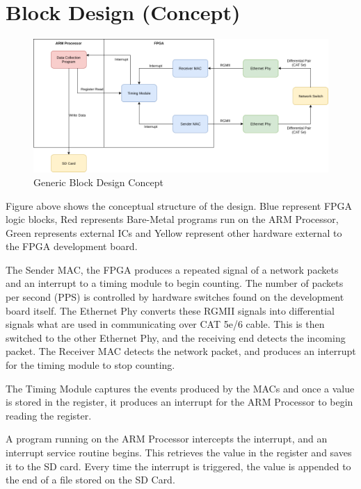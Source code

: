 \section{Block Design (Concept)}

\begin{figure}[H]
    \begin{center}
        \includegraphics[keepaspectratio,width=15cm]{Images/BlockDesignConcept}
        \caption{Generic Block Design Concept}
        \label{fig:blockdesignconcept}
    \end{center}
\end{figure}

\par Figure above shows the conceptual structure of the design. Blue represent FPGA logic blocks, Red represents 
Bare-Metal programs run on the ARM Processor, Green represents external ICs and Yellow represent other hardware 
external to the FPGA development board.

\par The Sender MAC, the FPGA produces a repeated signal of a network packets and an interrupt to a timing module to 
begin counting. The number of packets per second (PPS) is controlled by hardware switches found on the development 
board itself. The Ethernet Phy converts these RGMII signals into differential signals what are used in communicating 
over CAT 5e/6 cable. This is then switched to the other Ethernet Phy, and the receiving end detects the incoming 
packet. The Receiver MAC detects the network packet, and produces an interrupt for the timing module to stop counting.

\par The Timing Module captures the events produced by the MACs and once a value is stored in the register, it 
produces an interrupt for the ARM Processor to begin reading the register. 

\par A program running on the ARM Processor intercepts the interrupt, and an interrupt service routine begins. This 
retrieves the value in the register and saves it to the SD card. Every time the interrupt is triggered, the value is 
appended to the end of a file stored on the SD Card. 

